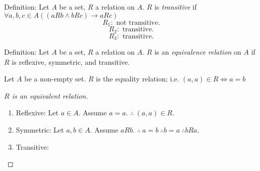 \noindent
Definition: Let $A$ be a set, $R$ a relation on $A$. $R$ is \emph{transitive} if $\forall a,b,c \in A ((aRb \wedge bRc)\to aRc)$
\[ R_1 : \text{ not transitive.}\]
\[ R_2 : \text{ transitive.} \]
\[ R_3 : \text{ transitive.} \]

\noindent
Definition: Let $A$ be a set, $R$ a relation on $A$. $R$ is an \emph{equivalence relation} on $A$ if $R$ is reflexive, symmetric, and transitive.
\begin{example}
Let $A$ be a non-empty set. $R$ is the equality relation; i.e. $(a,a)\in R \iff a=b$
\end{example}
\begin{proof}[$R$ is an equivalent relation]

\begin{enumerate}
\item Reflexive: Let $a\in A$. Assume $a=a$. $\therefore\ (a,a)\in R$.
\item Symmetric: Let $a,b \in A$. Assume $aRb$. $\therefore\ a=b\ \therefore b=a\ \therefore bRa$.
\item Transitive:
\end{enumerate}
\end{proof}


